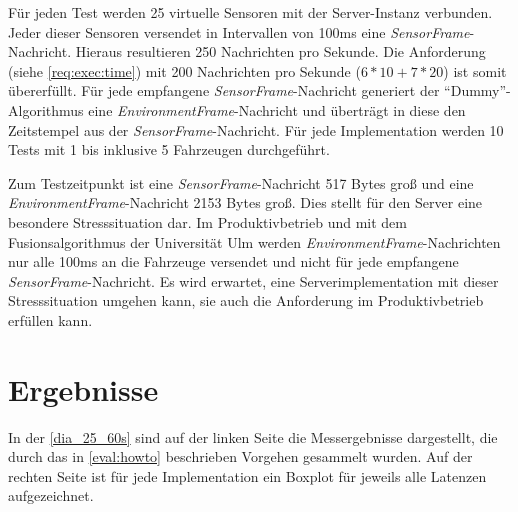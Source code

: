 Für jeden Test werden 25 virtuelle Sensoren mit der Server-Instanz verbunden.
Jeder dieser Sensoren versendet in Intervallen von 100ms eine \textit{SensorFrame}-Nachricht.
Hieraus resultieren 250 Nachrichten pro Sekunde.
Die Anforderung  (siehe \autoref{req:exec:time}) mit 200 Nachrichten pro Sekunde ($6*10 + 7*20$) ist somit übererfüllt.
Für jede empfangene \textit{SensorFrame}-Nachricht generiert der \enquote{Dummy}-Algorithmus eine \textit{EnvironmentFrame}-Nachricht und überträgt in diese den Zeitstempel aus der \textit{SensorFrame}-Nachricht.
Für jede Implementation werden 10 Tests mit 1 bis inklusive 5 Fahrzeugen durchgeführt.

Zum Testzeitpunkt ist eine \textit{SensorFrame}-Nachricht 517 Bytes groß und eine \textit{EnvironmentFrame}-Nachricht 2153 Bytes groß.
Dies stellt für den Server eine besondere Stresssituation dar.
Im Produktivbetrieb und mit dem Fusionsalgorithmus der Universität Ulm werden \textit{EnvironmentFrame}-Nachrichten nur alle 100ms an die Fahrzeuge versendet und nicht für jede empfangene \textit{SensorFrame}-Nachricht.
Es wird erwartet,  eine Serverimplementation mit dieser Stresssituation umgehen kann, sie auch die Anforderung  im Produktivbetrieb erfüllen kann.

\section{Ergebnisse}
\label{eval:results}

In der \autoref{dia_25_60s} sind auf der linken Seite die Messergebnisse dargestellt, die durch das in \autoref{eval:howto} beschrieben Vorgehen gesammelt wurden.
Auf der rechten Seite ist für jede Implementation ein Boxplot für jeweils alle Latenzen aufgezeichnet.

